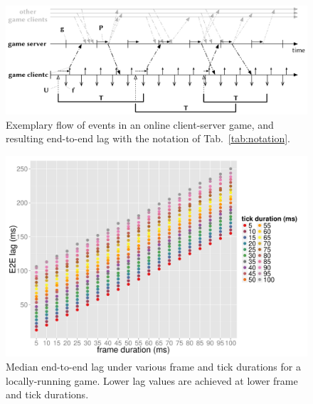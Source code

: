 \begin{figure}[!t]
	\centering
	\includegraphics[width=1.0\columnwidth]{../../../models/tickrate-timeseries-notation.pdf}
	\caption{Exemplary flow of events in an online client-server game, and resulting end-to-end lag with the notation of Tab.~\ref{tab:notation}.
	} %
\label{fig:tickrate-timeseries}
\end{figure}


\begin{figure}[!t]
	\centering
	\includegraphics[width=1.0\columnwidth]{../../../simulation/visualization/nwless-onlinegame-1000rounds.pdf}
	\caption{Median end-to-end lag under various frame and tick durations for a locally-running game. Lower lag values are achieved at lower frame and tick durations.}
\label{fig:nwless-scatter}
\end{figure}


